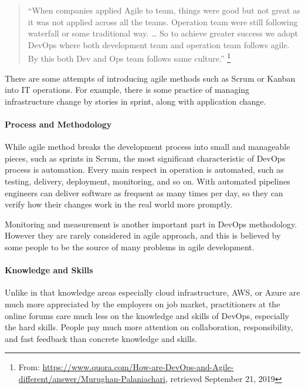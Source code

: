 \documentclass[
  12pt,
  a4paper,
]{article}
\begin{document}
\begin{quote}
``When companies applied Agile to team, things were good but not great
as it was not applied across all the teams. Operation team were still
following waterfall or some traditional way. \ldots{} So to achieve
greater success we adopt DevOps where both development team and
operation team follows agile. By this both Dev and Ops team follows same
culture.'' \footnote{From:
  \url{https://www.quora.com/How-are-DevOps-and-Agile-different/answer/Murughan-Palaniachari},
  retrieved September 21, 2019}
\end{quote}

There are some attempts of introducing agile methods such as Scrum or
Kanban into IT operations. For example, there is some practice of
managing infrastructure change by stories in sprint, along with
application change.

\hypertarget{process-and-methodology}{%
\paragraph{Process and Methodology}\label{process-and-methodology}}

While agile method breaks the development process into small and
manageable pieces, such as sprints in Scrum, the most significant
characteristic of DevOps process is automation. Every main respect in
operation is automated, such as testing, delivery, deployment,
monitoring, and so on. With automated pipelines engineers can deliver
software as frequent as many times per day, so they can verify how their
changes work in the real world more promptly.

Monitoring and measurement is another important part in DevOps
methodology. However they are rarely considered in agile approach, and
this is believed by some people to be the source of many problems in
agile development.

\hypertarget{knowledge-and-skills}{%
\paragraph{Knowledge and Skills}\label{knowledge-and-skills}}

Unlike in \citep{hussain2017nz} that knowledge areas especially cloud
infrastructure, AWS, or Azure are much more appreciated by the employers
on job market, practitioners at the online forums care much less on the
knowledge and skills of DevOps, especially the hard skills. People pay
much more attention on collaboration, responsibility, and fast feedback
than concrete knowledge and skills.
\end{document}
